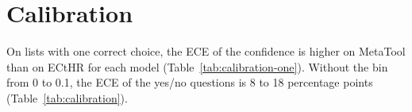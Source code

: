 \section{Calibration}
\label{app:calibration}
On lists with one correct choice, the ECE of the confidence is higher on MetaTool than on ECtHR for each model (Table~\ref{tab:calibration-one}). Without the bin from 0 to 0.1, the ECE of the yes/no questions is 8 to 18 percentage points (Table~\ref{tab:calibration}).

\begin{table}[H]
\caption{ECE in percentage points of the confidence on lists with one correct choice.}
\label{tab:calibration-one}
\centering
\footnotesize

\end{table}

\begin{table}[H]
\caption{ECE in percentage points of the probability of yes on the yes/no questions, over all bins (\emph{All bins}) and without the bin from 0 to 0.1 (\emph{From 0.1}).}
\label{tab:calibration}
\centering
\resizebox{\linewidth}{!}{}
\end{table}

\begin{table}[H]
\caption{ECE in percentage points of the probabilities on ChaosNLI against the shares of the 100 annotators, over bins of width 0.1 of the probability of a label.}
\label{tab:calibration-annotators}
\centering
\footnotesize

\end{table}
